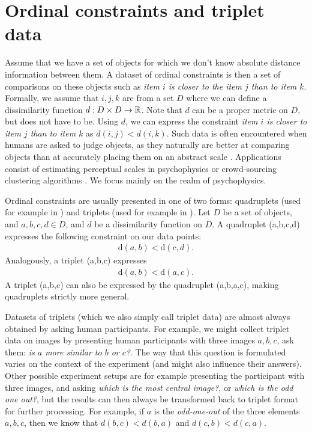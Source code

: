 \section{Ordinal constraints and triplet data}
Assume that we have a set of objects for which we don't know absolute distance information
between them. 
A dataset of ordinal constraints is then a set of comparisons on these
objects such as \textit{item $i$ is closer to the item $j$ than to item $k$}. 
Formally, we assume that $i, j, k$ are from 
a set $D$ where we can define a dissimilarity function $d: D \times D \to \mathbb{R}$. Note that $d$ can be a proper metric on $D$, but does not have to be.
Using $d$, we can express the constraint \textit{item $i$ is closer to item $j$ than to item $k$} 
as $d(i, j) < d(i, k)$. Such data is often encountered when humans are asked to judge objects, 
as they naturally are better at comparing objects
than at accurately placing them on an abstract scale \citep{demiralpLearningPerceptualKernels2014}. 
Applications consist of estimating perceptual scales in psychophysics 
\citep{haghiriEstimationPerceptualScales2020} or crowd-sourcing clustering algorithms \citep{ukkonenCrowdsourcedCorrelationClustering2017}. 
We focus mainly on the realm of psychophysics.

Ordinal constraints are usually presented in one of two forms: quadruplets (used for example in \cite{ghoshdastidarFoundationsComparisonBasedHierarchical2019}) and triplets (used for example in \cite{vankadaraInsightsOrdinalEmbedding2021,haghiriComparisonBasedFrameworkPsychophysics2019}).
Let $D$ be a set of objects, and $a,b,c,d \in D$, and $d$ be a dissimilarity function on $D$.
A quadruplet (a,b,c,d) expresses the following constraint on our data points: 
\begin{align*}
\text{d}(a,b) < \text{d}(c,d)
.\end{align*}
Analogously, a triplet (a,b,c) expresses 
\begin{align*}
\text{d}(a,b) < \text{d}(a,c) 
.\end{align*}
A triplet (a,b,c) can also be expressed by the quadruplet (a,b,a,c), making quadruplets strictly more general. 

Datasets of triplets (which we also simply call triplet data) are almost always obtained by asking human participants. For example, we might 
collect triplet data on images by presenting human participants with three images $a,b,c$, 
ask them: \textit{is $a$ more similar to $b$ or $c$?}.
The way that this question is formulated varies on the context of the experiment (and might also influence their answers). 
Other possible experiment setups are for example presenting the participant with three images, and asking \textit{which is the most central image?}, or \textit{which is the odd one out?},
but the results can then always be transformed back to triplet format for further processing. 
For example, if $a$ is the \textit{odd-one-out} of the three elements $a,b,c$, 
then we know that $d(b,c) < d(b,a)$ and $d(c, b) < d(c,a)$. 

